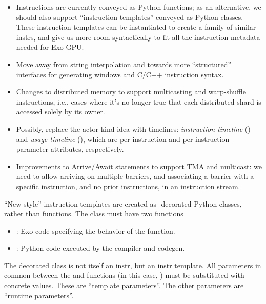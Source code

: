 \begin{itemize}
\item Instructions are currently conveyed as Python functions; as an alternative, we should also support ``instruction templates'' conveyed as Python classes.
These instruction templates can be instantiated to create a family of similar instrs, and give us more room syntactically to fit all the instruction metadata needed for Exo-GPU.
\item Move away from string interpolation and towards more ``structured'' interfaces for generating windows and C/C++ instruction syntax.
\item Changes to distributed memory to support multicasting and warp-shuffle instructions, i.e., cases where it's no longer true that each distributed shard is accessed solely by its owner.
\item Possibly, replace the actor kind idea with timelines: \textit{instruction timeline} () and \textit{usage timeline} (), which are per-instruction and per-instruction-parameter attributes, respectively.
\item Improvements to Arrive/Await statements to support TMA and multicast: we need to allow arriving on multiple barriers, and associating a barrier with a specific instruction, and no prior instructions, in an instruction stream.
\end{itemize}

\newpage
{}

``New-style'' instruction templates are created as -decorated Python classes, rather than functions.
The class must have two functions
\begin{itemize}
  \item {}: Exo code specifying the behavior of the function.
  \item {}: Python code executed by the compiler and codegen.
\end{itemize}



\filbreak
The decorated class is not itself an instr, but an instr template.
All parameters in common between the  and  functions (in this case, ) must be substituted with concrete values.
These are ``template parameters''.
The other  parameters are ``runtime parameters''.



